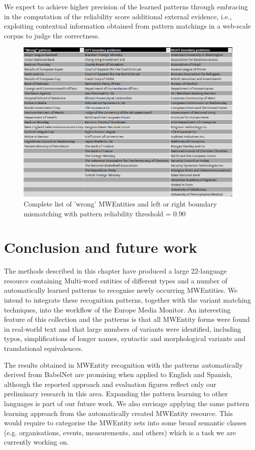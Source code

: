 \documentclass[output=paper]{langsci/langscibook}
\begin{document}
We expect to achieve higher precision of the learned patterns through
embracing in the computation of the reliability score additional
external evidence, i.e., exploiting contextual information obtained
from pattern matchings in a web-scale corpus to judge the correctness.

\begin{figure}
\centering
\includegraphics[scale=0.54]{figures/error_analysis.png}

\caption{Complete list of 'wrong' MWEntities and left or right boundary mismatching with pattern reliability threshold = 0.90}
\label{fig:error_analysis}
\end{figure}


\section{Conclusion and future work}
The methods described in this chapter have produced a large 22-language resource containing Multi-word entities of different types and a number of automatically learned patterns to recognise newly occurring MWEntities. We intend to integrate these recognition patterns, together with the variant matching techniques, into the workflow of the Europe Media Monitor. An interesting feature of this collection and the patterns is that all MWEntity forms were found in real-world text and that large numbers of variants were identified, including typos, simplifications of longer names, syntactic and morphological variants and translational equivalences.

The results obtained in MWEntity recognition with the patterns automatically derived from BabelNet are promising when applied to English and Spanish, although the reported approach and evaluation figures reflect only our preliminary research in this area. Expanding the pattern learning to other languages is part of our future work. We also envisage applying the same pattern learning approach from the automatically created MWEntity resource. This would require to categorise the MWEntity sets into some broad semantic classes (e.g. organisations, events, measurements, and others) which is a task we are currently working on.
\end{document}
